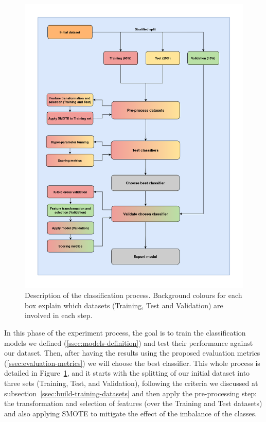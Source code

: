 \documentclass[a4paper, 12pt]{book}
\begin{document}
\begin{figure}
 \centering
  \includegraphics[width=16cm, keepaspectratio]{img/process-classification-models.png}
  \caption{Description of the classification process. Background colours for each box explain which datasets (Training, Test and Validation) are involved in each step.}
  \label{fig:model-classification-process}
\end{figure}

In this phase of the experiment process, the goal is to train the classification models we defined (\ref{ssec:models-definition}) and test their performance against our dataset. Then, after having the results using the proposed evaluation metrics (\ref{ssec:evaluation-metrics}) we will choose the best classifier. This whole process is detailed in Figure~\ref{fig:model-classification-process}, and it starts with the splitting of our initial dataset into three sets (Training, Test, and Validation), following the criteria we discussed at subsection~\ref{ssec:build-training-datasets} and then apply the pre-processing step: the transformation and selection of features (over the Training and Test datasets) and also applying SMOTE to mitigate the effect of the imbalance of the classes.
\end{document}
